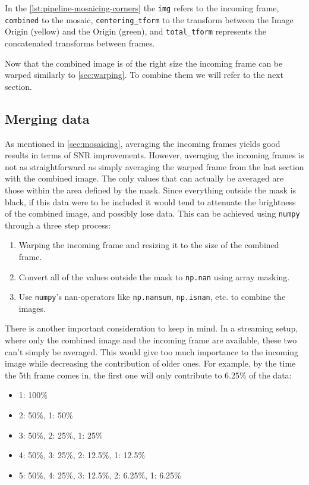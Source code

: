 In the \autoref{lst:pipeline-mosaicing-corners} the \lstinline{img} refers to the incoming frame, \lstinline{combined} to the mosaic, \lstinline{centering_tform} to the transform between the Image Origin (yellow) and the Origin (green), and \lstinline{total_tform} represents the concatenated transforms between frames. 

Now that the combined image is of the right size the incoming frame can be warped similarly to \autoref{sec:warping}. To combine them we will refer to the next section.

\subsection{Merging data}

As mentioned in \autoref{sec:mosaicing}, averaging the incoming frames yields good results in terms of SNR improvements. However, averaging the incoming frames is not as straightforward as simply averaging the warped frame from the last section with the combined image. The only values that can actually be averaged are those within the area defined by the mask. Since everything outside the mask is black, if this data were to be included it would tend to attenuate the brightness of the combined image, and possibly lose data. This can be achieved using \texttt{numpy} through a three step process:
\begin{enumerate}
    \item Warping the incoming frame and resizing it to the size of the combined frame.
    \item Convert all of the values outside the mask to \lstinline{np.nan} using array masking.
    \item Use \texttt{numpy}'s nan-operators like \lstinline{np.nansum}, \lstinline{np.isnan}, etc. to combine the images.
\end{enumerate}

There is another important consideration to keep in mind. In a streaming setup, where only the combined image and the incoming frame are available, these two can't simply be averaged. This would give too much importance to the incoming image while decreasing the contribution of older ones. For example, by the time the 5th frame comes in, the first one will only contribute to 6.25\% of the data:
\begin{itemize}
    \item 1: 100\%
    \item 2: 50\%, 1: 50\%
    \item 3: 50\%, 2: 25\%, 1: 25\%
    \item 4: 50\%, 3: 25\%, 2: 12.5\%, 1: 12.5\%
    \item 5: 50\%, 4: 25\%, 3: 12.5\%, 2: 6.25\%, 1: 6.25\%
\end{itemize}

